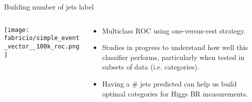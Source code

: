 \begin{frame}{Building number of jets label}

     \begin{columns}[c,onlytextwidth]
      \begin{column}{0.60\textwidth}
        \texttt{[image: fabricio/simple\_event\_vector\_\_100k\_roc.png]}
      \end{column}
      \begin{column}{0.40\textwidth}
        \begin{itemize}
            \item Multiclass ROC using one-versus-rest strategy.
            \item Studies in progress to understand how well this classifier performs, particularly when tested in subsets of data (i.e. categories).
            \item Having a \# jets predicted can help us build optimal categories for Higgs BR measurements.
        \end{itemize}
      \end{column}
  \end{columns}

\end{frame}